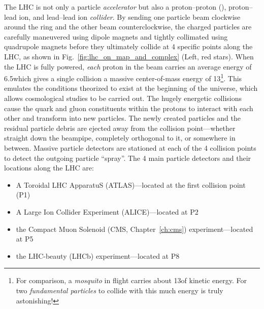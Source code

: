 The LHC is not only a particle \emph{accelerator} but also a proton--proton (\pp), proton--lead ion, and lead--lead ion \emph{collider}.
By sending one particle beam clockwise around the ring and the other beam counterclockwise, the charged particles are carefully maneuvered using dipole magnets and tightly collimated using quadrupole magnets before they ultimately collide at 4 specific points along the LHC, as shown in Fig.~\ref{fig:lhc_on_map_and_complex} (Left, red stars).
When the LHC is fully powered, \emph{each} proton in the beam carries an average energy of 6.5\TeV which gives a single \pp collision a massive center-of-mass energy of 13\TeV\footnote{
    For comparison, a \emph{mosquito} in flight carries about 13\TeV of kinetic energy.
    For two \emph{fundamental particles} to collide with this much energy is truly astonishing!
}.
This emulates the conditions theorized to exist at the beginning of the universe, which allows cosmological studies to be carried out.
The hugely energetic \pp collisions cause the quark and gluon constituents within the protons to interact with each other and transform into new particles.
The newly created particles and the residual particle debris are ejected away from the collision point---whether straight down the beampipe, completely orthogonal to it, or somewhere in between.
Massive particle detectors are stationed at each of the 4 collision points to detect the outgoing particle ``spray''.
The 4 main particle detectors and their locations along the LHC are:
\begin{itemize}
    \item A Toroidal LHC ApparatuS (ATLAS)---located at the first collision point (P1)
    \item A Large Ion Collider Experiment (ALICE)---located at P2
    \item the Compact Muon Solenoid (CMS, Chapter~\ref{ch:cms}) experiment---located at P5
    \item the LHC-beauty (LHCb) experiment---located at P8
\end{itemize}
